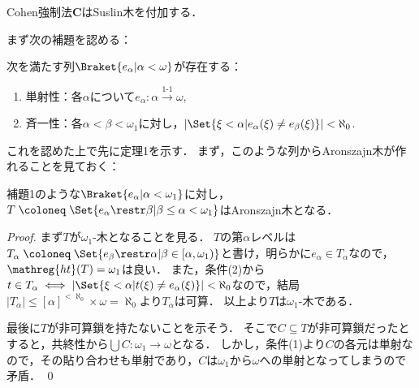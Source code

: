 \documentclass[a4j]{ltjsarticle}
\renewcommand{\defeq}{\mathrel{\coloneq}}
\begin{document}
\begin{theorem}\label{thm:Shel-Cohen-Suslin}
 Cohen強制法$\mathbf{C}$はSuslin木を付加する．
\end{theorem}

まず次の補題を認める：

\begin{lemma}\label{lem:coh-seq}
 次を満たす列$\Braket{e_\alpha | \alpha < \omega}$が存在する：
 \begin{enumerate}
  \item \label{item:ea-inj}単射性：各$\alpha$について$e_\alpha : \alpha \xrightarrow{\text{1-1}} \omega$,
  \item \label{lem:ea-coh}斉一性：各$\alpha < \beta < \omega_1$に対し，$|\Set{\xi < \alpha | e_\alpha(\xi) \neq e_\beta(\xi)}| < \aleph_0$.
 \end{enumerate}
\end{lemma}

これを認めた上で先に定理1を示す．
まず，このような列からAronszajn木が作れることを見ておく：

\begin{lemma}\label{lem:coh-to-arons}
 補題1のような$\Braket{e_\alpha | \alpha < \omega_1}$に対し，$T \defeq \Set{e_\alpha \restr \beta | \beta \leq \alpha < \omega_1}$はAronszajn木となる．
\end{lemma}
\begin{proof}
 まず$T$が$\omega_1$-木となることを見る．
 $T$の第$\alpha$レベルは$T_\alpha \defeq \Set{ e_\beta \restr \alpha | \beta \in [\alpha, \omega_1)}$と書け，明らかに$e_\alpha \in T_\alpha$なので，$\mathop{\mathreg{ht}}(T) = \omega_1$は良い．
 また，条件(2)から$t \in T_\alpha \iff |\Set{\xi < \alpha | t(\xi) \neq e_\alpha(\xi)}| < \aleph_0$なので，結局$|T_\alpha| \leq [\alpha]^{<\aleph_0} \times \omega = \aleph_0$より$T_\alpha$は可算．
 以上より$T$は$\omega_1$-木である．

 最後に$T$が非可算鎖を持たないことを示そう．
 そこで$C \subseteq T$が非可算鎖だったとすると，共終性から$\bigcup C: \omega_1 \to \omega$となる．
 しかし，条件(1)より$C$の各元は単射なので，その貼り合わせも単射であり，$C$は$\omega_1$から$\omega$への単射となってしまうので矛盾． \qed
\end{proof}
\end{document}
